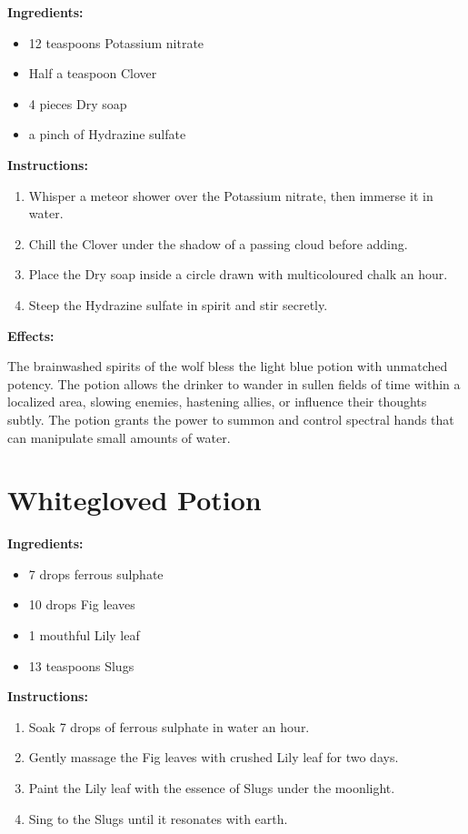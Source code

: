 \documentclass{article}
\begin{document}
\textbf{Ingredients:}

\begin{itemize}
  \item 12 teaspoons Potassium nitrate
  \item Half a teaspoon Clover
  \item 4 pieces Dry  soap
  \item a pinch of Hydrazine sulfate
\end{itemize}

\textbf{Instructions:}

\begin{enumerate}
  \item Whisper a meteor shower over the Potassium nitrate, then immerse it in water.
  \item Chill the Clover under the shadow of a passing cloud before adding.
  \item Place the Dry  soap inside a circle drawn with multicoloured chalk an hour.
  \item Steep the Hydrazine sulfate in spirit and stir secretly.
\end{enumerate}

\textbf{Effects:}

The brainwashed spirits of the wolf bless the light blue potion with unmatched potency. The potion allows the drinker to wander in sullen fields of time within a localized area, slowing enemies, hastening allies, or influence their thoughts subtly. The potion grants the power to summon and control spectral hands that can manipulate small amounts of water.

\newpage
\section*{Whitegloved Potion}

\textbf{Ingredients:}

\begin{itemize}
  \item 7 drops ferrous sulphate
  \item 10 drops Fig leaves
  \item 1 mouthful Lily leaf
  \item 13 teaspoons Slugs
\end{itemize}

\textbf{Instructions:}

\begin{enumerate}
  \item Soak 7 drops of ferrous sulphate in water an hour.
  \item Gently massage the Fig leaves with crushed Lily leaf for two days.
  \item Paint the Lily leaf with the essence of Slugs under the moonlight.
  \item Sing to the Slugs until it resonates with earth.
\end{enumerate}
\end{document}

